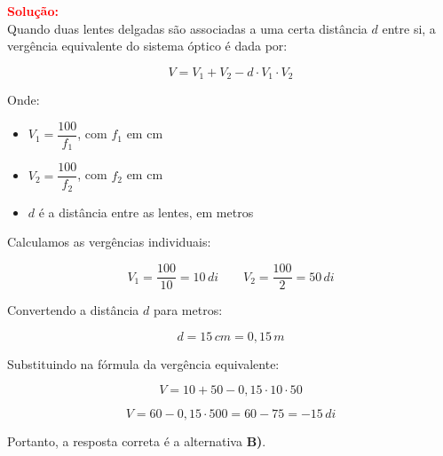 \begin{flushleft}
\begin{center}
\end{center}

\textcolor{red}{\textbf{Solu\c{c}\~ao:}}\\

Quando duas lentes delgadas s\~ao associadas a uma certa dist\^ancia $d$ entre si, a verg\^encia equivalente do sistema \'optico \'{e} dada por:

\[
\boxed{
V = V_1 + V_2 - d \cdot V_1 \cdot V_2
}
\]

Onde:
\begin{itemize}
    \item $V_1 = \dfrac{100}{f_1}$, com $f_1$ em cm
    \item $V_2 = \dfrac{100}{f_2}$, com $f_2$ em cm
    \item $d$ \'e a dist\^ancia entre as lentes, em metros
\end{itemize}

Calculamos as verg\^encias individuais:

\[
V_1 = \frac{100}{10} = 10\,di
\qquad
V_2 = \frac{100}{2} = 50\,di
\]

Convertendo a dist\^ancia $d$ para metros:

\[
d = 15\,cm = 0{,}15\,m
\]

Substituindo na f\'ormula da verg\^encia equivalente:

\[
V = 10 + 50 - 0{,}15 \cdot 10 \cdot 50
\]

\[
V = 60 - 0{,}15 \cdot 500 = 60 - 75 = -15\,di
\]

\vspace{0.3cm}

Portanto, a resposta correta \'e a alternativa \colorbox{green!50}{\textbf{B)}}.

\end{flushleft}


